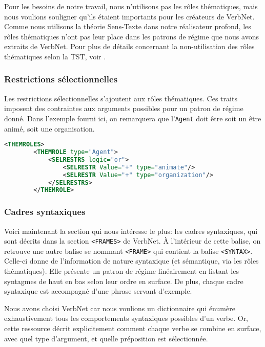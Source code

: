 Pour les besoins de notre travail, nous n'utilisons pas les rôles thématiques, mais nous voulions souligner qu'ils étaient importants pour les créateurs de VerbNet. Comme nous utilisons la théorie Sens-Texte dans notre réalisateur profond, les rôles thématiques n'ont pas leur place dans les patrons de régime que nous avons extraits de VerbNet. Pour plus de détails concernant la non-utilisation des rôles thématiques selon la TST, voir \cite[pp.~227--234]{mel2012semantics}.

\subsubsection{Restrictions sélectionnelles}
Les restrictions sélectionnelles s'ajoutent aux rôles thématiques. Ces traits imposent des contraintes aux arguments possibles pour un patron de régime donné. Dans l'exemple fourni ici, on remarquera que l'\texttt{Agent} doit être soit un être animé, soit une organisation.

\begin{lstlisting}[language=Xml, caption = Les restrictions sélectionnelles]
    <THEMROLES>
        <THEMROLE type="Agent">
            <SELRESTRS logic="or">
                <SELRESTR Value="+" type="animate"/>
                <SELRESTR Value="+" type="organization"/>
            </SELRESTRS>
        </THEMROLE>
\end{lstlisting}

\subsubsection{Cadres syntaxiques}

Voici maintenant la section qui nous intéresse le plus: les cadres syntaxiques, qui sont décrits dans la section \lstinline{<FRAMES>} de VerbNet. À l'intérieur de cette balise, on retrouve une autre balise se nommant \lstinline{<FRAME>} qui contient la balise \lstinline{<SYNTAX>}. Celle-ci donne de l'information de nature syntaxique (et sémantique, via les rôles thématiques). Elle présente un patron de régime linéairement en listant les syntagmes de haut en bas selon leur ordre en surface. De plus, chaque cadre syntaxique est accompagné d'une phrase servant d'exemple.

Nous avons choisi VerbNet car nous voulions un dictionnaire qui énumère exhaustivement tous les comportements syntaxiques possibles d'un verbe. Or, cette ressource décrit explicitement comment chaque verbe se combine en surface, avec quel type d'argument, et quelle préposition est sélectionnée.

